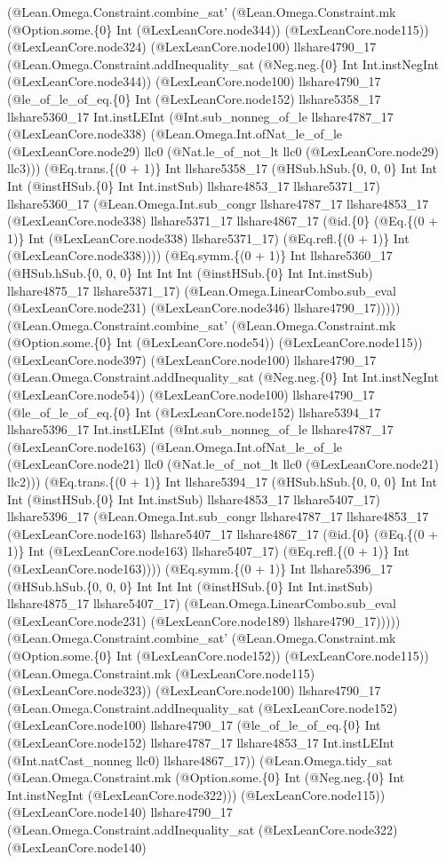 \documentclass[11pt]{article}
\begin{document}
(@Lean.Omega.Constraint.combine\_sat' (@Lean.Omega.Constraint.mk (@Option.some.\{0\} Int (@LexLeanCore.node344)) (@LexLeanCore.node115)) (@LexLeanCore.node324) (@LexLeanCore.node100) llshare4790\_17 (@Lean.Omega.Constraint.addInequality\_sat (@Neg.neg.\{0\} Int Int.instNegInt (@LexLeanCore.node344)) (@LexLeanCore.node100) llshare4790\_17 (@le\_of\_le\_of\_eq.\{0\} Int (@LexLeanCore.node152) llshare5358\_17 llshare5360\_17 Int.instLEInt (@Int.sub\_nonneg\_of\_le llshare4787\_17 (@LexLeanCore.node338) (@Lean.Omega.Int.ofNat\_le\_of\_le (@LexLeanCore.node29) llc0 (@Nat.le\_of\_not\_lt llc0 (@LexLeanCore.node29) llc3))) (@Eq.trans.\{(0 + 1)\} Int llshare5358\_17 (@HSub.hSub.\{0, 0, 0\} Int Int Int (@instHSub.\{0\} Int Int.instSub) llshare4853\_17 llshare5371\_17) llshare5360\_17 (@Lean.Omega.Int.sub\_congr llshare4787\_17 llshare4853\_17 (@LexLeanCore.node338) llshare5371\_17 llshare4867\_17 (@id.\{0\} (@Eq.\{(0 + 1)\} Int (@LexLeanCore.node338) llshare5371\_17) (@Eq.refl.\{(0 + 1)\} Int (@LexLeanCore.node338)))) (@Eq.symm.\{(0 + 1)\} Int llshare5360\_17 (@HSub.hSub.\{0, 0, 0\} Int Int Int (@instHSub.\{0\} Int Int.instSub) llshare4875\_17 llshare5371\_17) (@Lean.Omega.LinearCombo.sub\_eval (@LexLeanCore.node231) (@LexLeanCore.node346) llshare4790\_17))))) (@Lean.Omega.Constraint.combine\_sat' (@Lean.Omega.Constraint.mk (@Option.some.\{0\} Int (@LexLeanCore.node54)) (@LexLeanCore.node115)) (@LexLeanCore.node397) (@LexLeanCore.node100) llshare4790\_17 (@Lean.Omega.Constraint.addInequality\_sat (@Neg.neg.\{0\} Int Int.instNegInt (@LexLeanCore.node54)) (@LexLeanCore.node100) llshare4790\_17 (@le\_of\_le\_of\_eq.\{0\} Int (@LexLeanCore.node152) llshare5394\_17 llshare5396\_17 Int.instLEInt (@Int.sub\_nonneg\_of\_le llshare4787\_17 (@LexLeanCore.node163) (@Lean.Omega.Int.ofNat\_le\_of\_le (@LexLeanCore.node21) llc0 (@Nat.le\_of\_not\_lt llc0 (@LexLeanCore.node21) llc2))) (@Eq.trans.\{(0 + 1)\} Int llshare5394\_17 (@HSub.hSub.\{0, 0, 0\} Int Int Int (@instHSub.\{0\} Int Int.instSub) llshare4853\_17 llshare5407\_17) llshare5396\_17 (@Lean.Omega.Int.sub\_congr llshare4787\_17 llshare4853\_17 (@LexLeanCore.node163) llshare5407\_17 llshare4867\_17 (@id.\{0\} (@Eq.\{(0 + 1)\} Int (@LexLeanCore.node163) llshare5407\_17) (@Eq.refl.\{(0 + 1)\} Int (@LexLeanCore.node163)))) (@Eq.symm.\{(0 + 1)\} Int llshare5396\_17 (@HSub.hSub.\{0, 0, 0\} Int Int Int (@instHSub.\{0\} Int Int.instSub) llshare4875\_17 llshare5407\_17) (@Lean.Omega.LinearCombo.sub\_eval (@LexLeanCore.node231) (@LexLeanCore.node189) llshare4790\_17))))) (@Lean.Omega.Constraint.combine\_sat' (@Lean.Omega.Constraint.mk (@Option.some.\{0\} Int (@LexLeanCore.node152)) (@LexLeanCore.node115)) (@Lean.Omega.Constraint.mk (@LexLeanCore.node115) (@LexLeanCore.node323)) (@LexLeanCore.node100) llshare4790\_17 (@Lean.Omega.Constraint.addInequality\_sat (@LexLeanCore.node152) (@LexLeanCore.node100) llshare4790\_17 (@le\_of\_le\_of\_eq.\{0\} Int (@LexLeanCore.node152) llshare4787\_17 llshare4853\_17 Int.instLEInt (@Int.natCast\_nonneg llc0) llshare4867\_17)) (@Lean.Omega.tidy\_sat (@Lean.Omega.Constraint.mk (@Option.some.\{0\} Int (@Neg.neg.\{0\} Int Int.instNegInt (@LexLeanCore.node322))) (@LexLeanCore.node115)) (@LexLeanCore.node140) llshare4790\_17 (@Lean.Omega.Constraint.addInequality\_sat (@LexLeanCore.node322) (@LexLeanCore.node140) 
\end{document}
